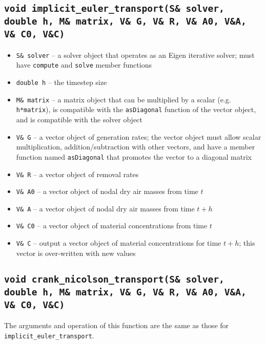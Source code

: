 \documentclass[10pt]{report}
\begin{document}
\subsection{\texttt{void implicit\_euler\_transport(S\& solver, double h, M\& matrix, V\& G, V\& R, V\& A0, V\&A, V\& C0, V\&C)}}
\begin{itemize}
\item \texttt{S\& solver} -- a solver object that operates as an Eigen iterative solver; must have \texttt{compute} and \texttt{solve} member functions
\item \texttt{double h} -- the timestep size
\item \texttt{M\& matrix} -- a matrix object that can be multiplied by a scalar (e.g. \texttt{h*matrix}), is compatible with the \texttt{asDiagonal} function of the vector object, and is compatible with the solver object
\item \texttt{V\& G} -- a vector object of generation rates; the vector object must allow scalar multiplication, addition/subtraction with other vectors, and have a member function named \texttt{asDiagonal} that promotes the vector to a diagonal matrix
\item \texttt{V\& R} -- a vector object of removal rates
\item \texttt{V\& A0} -- a vector object of nodal dry air masses from time $t$
\item \texttt{V\& A} -- a vector object of nodal dry air masses from time $t+h$
\item \texttt{V\& C0} -- a vector object of material concentrations from time $t$
\item \texttt{V\& C} -- output a vector object of material concentrations for time $t+h$; this vector is over-written with new values
\end{itemize}
\subsection{\texttt{void crank\_nicolson\_transport(S\& solver, double h, M\& matrix, V\& G, V\& R, V\& A0, V\&A, V\& C0, V\&C)}}
The arguments and operation of this function are the same as those for
\texttt{implicit\_euler\_transport}.
\end{document}
